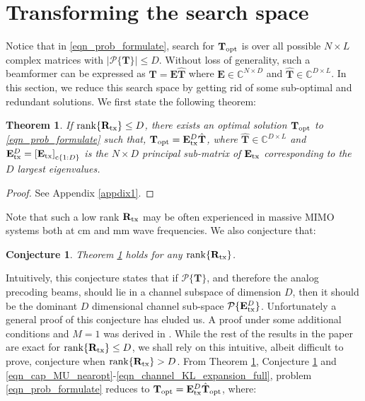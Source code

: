 \documentclass[journal,comsoc]{IEEEtran}
\newtheorem{theorem}{Theorem}[section]
\newtheorem{conjec}{Conjecture}[section]
\begin{document}
\section{Transforming the search space} \label{sec_restrict_search_space}
Notice that in \eqref{eqn_prob_formulate}, search for $\mathbf{T}_{\rm opt}$ is over all possible $N \times L$ complex matrices with $|\mathcal{P}\{\mathbf{T}\}| \leq D$. Without loss of generality, such a beamformer can be expressed as $\mathbf{T} = \mathbf{E} \hat{\mathbf{T}}$ where $\mathbf{E} \in \mathbb{C}^{N\times D}$ and $\hat{\mathbf{T}} \in \mathbb{C}^{D \times L}$. In this section, we reduce this search space by getting rid of some sub-optimal and redundant solutions. We first state the following theorem:
\begin{theorem} \label{Th_restrict_dom_eigspace}
If ${\rm rank}\{\mathbf{R}_{\rm tx}\} \leq D$, there exists an optimal solution $\mathbf{T}_{\rm opt}$ to \eqref{eqn_prob_formulate} such that, $\mathbf{T}_{\rm opt} = \mathbf{E}^D_{\rm tx} \hat{\mathbf{T}}$, where $\hat{\mathbf{T}} \in \mathbb{C}^{D \times L}$ and $\mathbf{E}^D_{\rm tx} = {[\mathbf{E}_{\rm tx}]}_{{\rm c}\{1:D\}}$ is the $N \times D$ principal sub-matrix of $\mathbf{E}_{\rm tx}$ corresponding to the $D$ largest eigenvalues.
\end{theorem}
\begin{proof}
See Appendix \ref{appdix1}.
\end{proof}
Note that such a low rank $\mathbf{R}_{\rm tx}$ may be often experienced in massive MIMO systems both at cm and mm wave frequencies. We also conjecture that:
\begin{conjec} \label{conj_dom_eigspace}
Theorem \ref{Th_restrict_dom_eigspace} holds for any ${\rm rank}\{\mathbf{R}_{\rm tx}\}$.
\end{conjec}
%
Intuitively, this conjecture states that if $\mathcal{P}\{\mathbf{T}\}$, and therefore the analog precoding beams, should lie in a channel subspace of dimension $D$, then it should be the dominant $D$ dimensional channel sub-space $\mathcal{P}\{\mathbf{E}^D_{\rm tx}\}$. 
Unfortunately a general proof of this conjecture has eluded us. A proof under some additional conditions and $M=1$ was derived in \cite{Vishnu_Globecom}. While the rest of the results in the paper are exact for ${\rm rank}\{\mathbf{R}_{\rm tx}\} \leq D$, we shall rely on this intuitive, albeit difficult to prove, conjecture when ${\rm rank}\{\mathbf{R}_{\rm tx}\} > D$. 
From Theorem \ref{Th_restrict_dom_eigspace}, Conjecture \ref{conj_dom_eigspace} and \eqref{eqn_cap_MU_nearopt}-\eqref{eqn_channel_KL_expansion_full}, problem \eqref{eqn_prob_formulate} reduces to $\mathbf{T}_{\rm opt} = \mathbf{E}_{\rm tx}^D \hat{\mathbf{T}}_{\rm opt}$, where:
\end{document}
